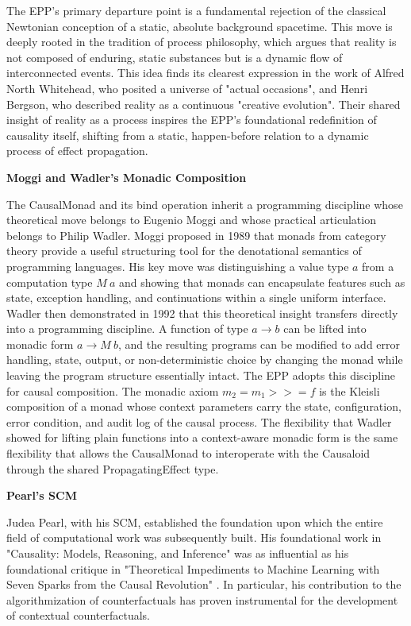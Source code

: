 The EPP's primary departure point is a fundamental rejection of the classical Newtonian conception of a static, absolute background spacetime. This move is deeply rooted in the tradition of process philosophy, which argues that reality is not composed of enduring, static substances but is a dynamic flow of interconnected events. This idea finds its clearest expression in the work of Alfred North Whitehead, who posited a universe of "actual occasions"\cite{whitehead2010process}, and Henri Bergson, who described reality as a continuous "creative evolution"\cite{bergson2022creative}. Their shared insight of reality as a process inspires the EPP's foundational redefinition of causality itself, shifting from a static, happen-before relation to a dynamic process of effect propagation.

\newpage

\textbf{Moggi and Wadler's Monadic Composition}
 
The CausalMonad and its bind operation inherit a programming discipline whose theoretical move belongs to Eugenio Moggi and whose practical articulation belongs to Philip Wadler. Moggi proposed in 1989 that monads from category theory provide a useful structuring tool for the denotational semantics of programming languages\cite{moggi1989computational}. His key move was distinguishing a value type $a$ from a computation type $M\ a$ and showing that monads can encapsulate features such as state, exception handling, and continuations within a single uniform interface. Wadler then demonstrated in 1992 that this theoretical insight transfers directly into a programming discipline\cite{wadler1992essence}. A function of type $a \to b$ can be lifted into monadic form $a \to M\ b$, and the resulting programs can be modified to add error handling, state, output, or non-deterministic choice by changing the monad while leaving the program structure essentially intact. The EPP adopts this discipline for causal composition. The monadic axiom $m_2 = m_1 \mathbin{>\!\!>\!\!=} f$ is the Kleisli composition of a monad whose context parameters carry the state, configuration, error condition, and audit log of the causal process. The flexibility that Wadler showed for lifting plain functions into a context-aware monadic form is the same flexibility that allows the CausalMonad to interoperate with the Causaloid through the shared PropagatingEffect type.
 

\textbf{Pearl's SCM}

Judea Pearl, with his SCM, established the foundation upon which the entire field of computational work was subsequently built. His foundational work in "Causality: Models, Reasoning, and Inference" \cite{pearl2000causality} was as influential as his foundational critique in "Theoretical Impediments to Machine Learning with Seven Sparks from the Causal Revolution" \cite{pearl2018theoretical}. In particular, his contribution to the algorithmization of counterfactuals has proven instrumental for the development of contextual counterfactuals.

